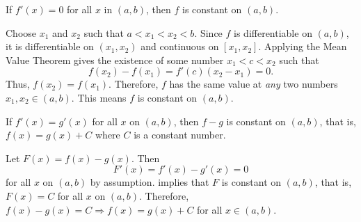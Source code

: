 \documentclass{book}
\begin{document}
\begin{Thm}\label{thm:something} If $f'(x) = 0$ for all $x$ in  $(a,b)$, then $f$ is constant on $(a,b)$.\end{Thm}
\begin{pf}
Choose $x_1$ and $x_2$ such that $a < x_1 < x_2 < b$. Since $f$ is differentiable on $(a,b)$, it is differentiable on $(x_1,x_2)$ and continuous on $[x_1,x_2]$. Applying the Mean Value Theorem gives the existence of some number $x_1 < c< x_2$ such that \[f(x_2) - f(x_1) = f'(c)(x_2-x_1) = 0.\] Thus, $f(x_2) = f(x_1)$. Therefore, $f$ has the same value at \emph{any} two numbers $x_1, x_2\in (a,b)$. This means $f$ is constant on $(a,b)$.
\end{pf}\vs

\begin{Cor}\label{cor:something} If $f'(x) = g'(x)$ for all $x$ on $(a,b)$, then $f-g$ is constant on $(a,b)$, that is, $f(x) = g(x) + C$ where $C$ is a constant number.\end{Cor}
\begin{pf}
Let $F(x) = f(x) - g(x)$. Then \[F'(x) = f'(x) - g'(x) = 0\] for all $x$ on  $(a,b)$ by assumption.  implies that $F$ is constant on $(a,b)$, that is, $F(x) = C$ for all $x$ on $(a,b)$. Therefore, $f(x) - g(x) = C \Longrightarrow f(x) = g(x)+C$ for all $x\in (a,b)$.
\end{pf}\vs



\vfill
{}
\pagebreak
\end{document}
